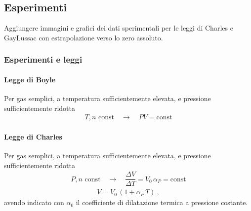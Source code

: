 \documentclass[letterpaper,10pt,italian]{jupyterBook}
\begin{document}
\sphinxstepscope


\subsection{Esperimenti}
\label{\detokenize{ch/thermodynamics/ideal-gas-experiments:esperimenti}}\label{\detokenize{ch/thermodynamics/ideal-gas-experiments:physics-hs-thermodynamics-matter-gases-ideal-experiments}}\label{\detokenize{ch/thermodynamics/ideal-gas-experiments::doc}}
\sphinxAtStartPar
{} Aggiungere immagini e grafici dei dati sperimentali per le leggi di Charles e Gay\sphinxhyphen{}Lussac con estrapolazione verso lo zero assoluto.


\subsubsection{Esperimenti e leggi}
\label{\detokenize{ch/thermodynamics/ideal-gas-experiments:esperimenti-e-leggi}}

\paragraph{Legge di Boyle}
\label{\detokenize{ch/thermodynamics/ideal-gas-experiments:legge-di-boyle}}\label{\detokenize{ch/thermodynamics/ideal-gas-experiments:physics-hs-thermodynamics-matter-gases-ideal-experiments-boyle}}
\sphinxAtStartPar
Per gas semplici, a temperatura sufficientemente elevata, e pressione sufficientemente ridotta
\begin{equation*}
\begin{split}T, n \text{ const} \quad \rightarrow \quad P V = \text{const}\end{split}
\end{equation*}

\paragraph{Legge di Charles}
\label{\detokenize{ch/thermodynamics/ideal-gas-experiments:legge-di-charles}}\label{\detokenize{ch/thermodynamics/ideal-gas-experiments:physics-hs-thermodynamics-matter-gases-ideal-experiments-charles}}
\sphinxAtStartPar
Per gas semplici, a temperatura sufficientemente elevata, e pressione sufficientemente ridotta
\begin{equation*}
\begin{split}P, n \text{ const} \quad \rightarrow \quad \dfrac{\Delta V}{\Delta T} = V_0 \, \alpha_P = \text{const}\end{split}
\end{equation*}\begin{equation*}
\begin{split}V = V_0 \, ( 1 + \alpha_P \, T ) \ ,\end{split}
\end{equation*}
\sphinxAtStartPar
avendo indicato con \(\alpha_0\) il coefficiente di dilatazione termica a pressione costante.
\end{document}
